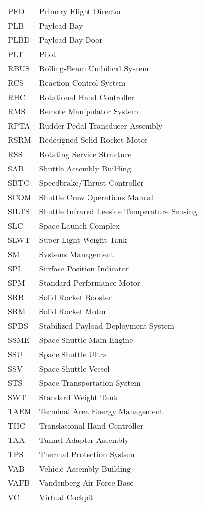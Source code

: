 \documentclass[Space_Shuttle_Vessel_Manual.tex]{subfiles}
\begin{document}
\begin{longtable}{l l }
PFD & Primary Flight Director\\
PLB & Payload Bay\\
PLBD & Payload Bay Door\\
PLT & Pilot\\
RBUS & Rolling-Beam Umbilical System\\
RCS & Reaction Control System\\
RHC & Rotational Hand Controller\\
RMS & Remote Manipulator System\\
RPTA & Rudder Pedal Transducer Assembly\\
RSRM & Redesigned Solid Rocket Motor\\
RSS & Rotating Service Structure\\
SAB & Shuttle Assembly Building\\
SBTC & Speedbrake/Thrust Controller\\
SCOM & Shuttle Crew Operations Manual\\
SILTS & Shuttle Infrared Leeside Temperature Sensing\\
SLC & Space Launch Complex\\
SLWT & Super Light Weight Tank\\
SM & Systems Management\\
SPI & Surface Position Indicator\\
SPM & Standard Performance Motor\\
SRB & Solid Rocket Booster\\
SRM & Solid Rocket Motor\\
SPDS & Stabilized Payload Deployment System\\
SSME & Space Shuttle Main Engine\\
SSU & Space Shuttle Ultra\\
SSV & Space Shuttle Vessel\\
STS & Space Transportation System\\
SWT & Standard Weight Tank\\
TAEM & Terminal Area Energy Management\\
THC & Translational Hand Controller\\
TAA & Tunnel Adapter Assembly\\
TPS & Thermal Protection System\\
VAB & Vehicle Assembly Building\\
VAFB & Vandenberg Air Force Base\\
VC & Virtual Cockpit\\
\end{longtable}
\end{document}
